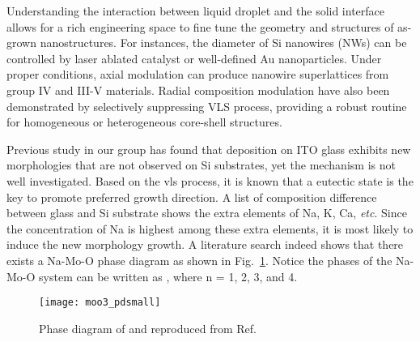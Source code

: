 Understanding the interaction between liquid droplet and the solid interface allows for a rich engineering space to fine tune the geometry and structures of as-grown nanostructures. For instances, the diameter of Si nanowires (NWs) can be controlled by laser ablated catalyst\cite{Morales1998} or well-defined Au nanoparticles.\cite{Cui2001b} Under proper conditions, axial modulation can produce nanowire superlattices from group IV and III-V materials.\citep{Gudiksen2002,Bjork2002}  Radial composition modulation have also been demonstrated by selectively suppressing VLS process, providing a robust routine for homogeneous or heterogeneous core-shell structures.\cite{Lauhon2002a}  

Previous study in our group has found that  deposition on ITO glass exhibits new morphologies that are not observed on Si substrates, yet the mechanism is not well investigated.\cite{predeep2011} Based on the \gls{vls} process, it is known that a eutectic state is the key to promote preferred growth direction. A list of composition difference between glass and Si substrate shows the extra elements of Na, K, Ca, \emph{etc}. Since the concentration of Na is highest among these extra elements, it is most likely to induce the new morphology growth. A literature search indeed shows that there exists a Na-Mo-O phase diagram as shown in Fig.~\ref{fig:ch4pd}.\cite{Hoermann1929} Notice the phases of the Na-Mo-O system can be written as , where n = 1, 2, 3, and 4. 

\begin{figure}[htb]
\centering
\texttt{[image: moo3\_pdsmall]}
\caption[Phase diagram of Na-Mo-O system]{Phase diagram of  and  reproduced from Ref.~\cite{Hoermann1929}}
\label{fig:ch4pd}
\end{figure}

